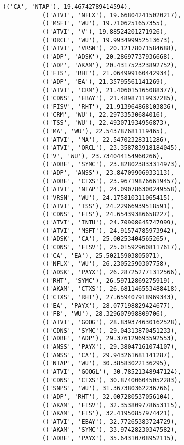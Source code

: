 \documentclass[11pt]{article}
\begin{document}
\begin{Verbatim}[commandchars=\\\{\}]
           (('CA', 'NTAP'), 19.46742789414594),
           (('ATVI', 'NFLX'), 19.668042415020217),
           (('MSFT', 'WU'), 19.7106251657355),
           (('ATVI', 'V'), 19.88524201271926),
           (('ORCL', 'WU'), 19.993499952513673),
           (('ATVI', 'VRSN'), 20.12178071584688),
           (('ADP', 'ADSK'), 20.28697737936668),
           (('ADP', 'AKAM'), 20.431752323892752),
           (('FIS', 'RHT'), 21.064999160442934),
           (('ADP', 'EA'), 21.35795561141269),
           (('ATVI', 'CRM'), 21.406015165088377),
           (('CDNS', 'EBAY'), 21.48987119937285),
           (('FISV', 'RHT'), 21.913964868103836),
           (('CRM', 'WU'), 22.29733530684016),
           (('TSS', 'WU'), 22.493071934956873),
           (('MA', 'WU'), 22.543787681119465),
           (('ATVI', 'MA'), 22.54702328311286),
           (('ATVI', 'ORCL'), 23.358783918184045),
           (('V', 'WU'), 23.734044154960266),
           (('ADBE', 'SYMC'), 23.828023833314973),
           (('ADP', 'ANSS'), 23.84709906933113),
           (('ADBE', 'CTXS'), 23.967198766619457),
           (('ATVI', 'NTAP'), 24.090786300249558),
           (('VRSN', 'WU'), 24.175810311065415),
           (('ATVI', 'TSS'), 24.22966939518591),
           (('CDNS', 'FIS'), 24.65439386658227),
           (('ATVI', 'INTU'), 24.70908645747999),
           (('ATVI', 'MSFT'), 24.91574785973942),
           (('ADSK', 'CA'), 25.00253404565265),
           (('CDNS', 'FISV'), 25.015929608117617),
           (('CA', 'EA'), 25.50215903805071),
           (('NFLX', 'WU'), 26.23052590307758),
           (('ADSK', 'PAYX'), 26.287252771312566),
           (('RHT', 'SYMC'), 26.59712869275919),
           (('AKAM', 'CTXS'), 26.681146553488418),
           (('CTXS', 'RHT'), 27.659407918969343),
           (('EA', 'PAYX'), 28.077198829424677),
           (('FB', 'WU'), 28.329607998809706),
           (('ATVI', 'GOOG'), 28.839374630162528),
           (('CDNS', 'SYMC'), 29.04313870451233),
           (('ADBE', 'ADP'), 29.376129693592553),
           (('ANSS', 'PAYX'), 29.38047161074107),
           (('ANSS', 'CA'), 29.943261681141287),
           (('NTAP', 'WU'), 30.38583022136295),
           (('ATVI', 'GOOGL'), 30.78521348947124),
           (('CDNS', 'CTXS'), 30.874006045052283),
           (('SNPS', 'WU'), 31.367380362236766),
           (('ADP', 'RHT'), 32.007280537056104),
           (('AKAM', 'FISV'), 32.353809778653115),
           (('AKAM', 'FIS'), 32.41950857974421),
           (('ATVI', 'EBAY'), 32.77265383724729),
           (('AKAM', 'SYMC'), 33.97428230347582),
           (('ADBE', 'PAYX'), 35.64310708952115),

\end{Verbatim}
\end{document}
